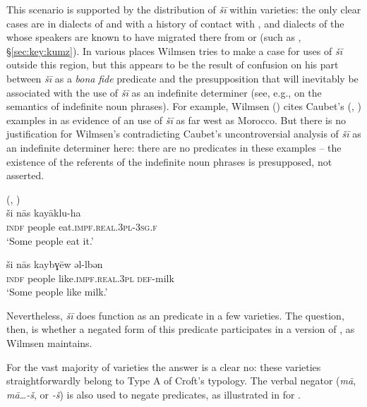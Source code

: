 \documentclass[output=paper]{langsci/langscibook}
\begin{document}
This scenario is supported by the distribution of  \textit{šī} within  varieties: the only clear cases are in dialects of  and  with a history of contact with , and dialects of the  whose speakers are known to have migrated there from  or  (such as , §\ref{sec:key:kumz}). In various places Wilmsen tries to make a case for  uses of \textit{šī} outside this region, but this appears to be the result of confusion on his part between \textit{šī} as a \textit{bona} \textit{fide}  predicate and the  presupposition that will inevitably be associated with the use of \textit{šī} as an indefinite determiner (see, e.g., \citealt{Heim1988} on the semantics of indefinite noun phrases). For example, Wilmsen (\citeyear[123]{Wilmsen2014}) cites Caubet’s (\citeyear[123]{Caubet1993a}, \citeyear[280]{Caubet1993b})   examples in  as evidence of an  use of \textit{šī} as far west as Morocco. But there is no justification for Wilmsen’s contradicting Caubet’s uncontroversial analysis of \textit{šī} as an indefinite determiner here: there are no  predicates in these examples – the existence of the referents of the indefinite noun phrases is presupposed, not asserted.

\ea\label{mor}
{  (\citealt[123]{Caubet1993a}, \citealt[280]{Caubet1993b})}\\
\ea\gll ši nās kayāklu-ha\\
     \textsc{indf} people eat.\textsc{impf.real.3pl-3sg.f}  \\
\glt ‘Some people eat it.’

\ex
\gll ši nās kaybɣēw əl-lbən\\
     \textsc{indf} people like.\textsc{impf.real.3pl} \textsc{def-}milk\\
\glt  ‘Some people like milk.’
\z
\z

Nevertheless, \textit{šī} does function as an  predicate in a few  varieties. The question, then, is whether a negated form of this predicate participates in a version of , as Wilmsen maintains.

For the vast majority of  varieties the answer is a clear no: these varieties straightforwardly belong to Type A of Croft’s typology. The verbal negator (\textit{mā}, \textit{mā…-š}, or \textit{{}-š}) is also used to negate  predicates, as illustrated in  for  .
\end{document}
